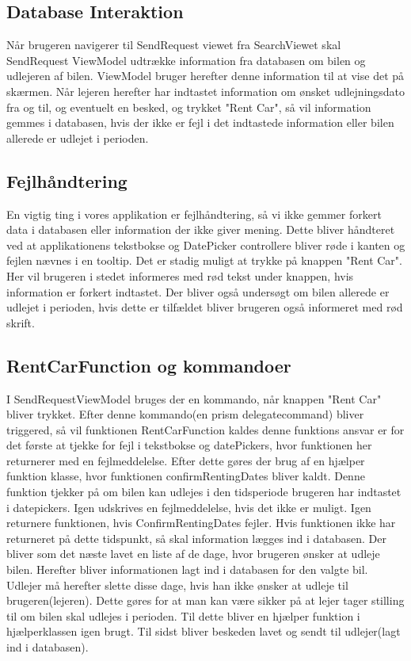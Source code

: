 \documentclass[SoftwareDesign/SoftwareDesign_main.tex]{subfiles}
\begin{document}
\subsection{Database Interaktion}
Når brugeren navigerer til SendRequest viewet fra SearchViewet skal SendRequest ViewModel udtrække information fra databasen om bilen og udlejeren af bilen. ViewModel bruger herefter denne information til at vise det på skærmen. Når lejeren herefter har indtastet information om ønsket udlejningsdato fra og til, og eventuelt en besked, og trykket "Rent Car", så vil information gemmes i databasen, hvis der ikke er fejl i det indtastede information eller bilen allerede er udlejet i perioden. 
\subsection{Fejlhåndtering}
En vigtig ting i vores applikation er fejlhåndtering, så vi ikke gemmer forkert data i databasen eller information der ikke giver mening. Dette bliver håndteret ved at applikationens tekstbokse og DatePicker controllere bliver røde i kanten og fejlen nævnes i en tooltip. Det er stadig muligt at trykke på knappen "Rent Car". Her vil brugeren i stedet informeres med rød tekst under knappen, hvis information er forkert indtastet. Der bliver også undersøgt om bilen allerede er udlejet i perioden, hvis dette er tilfældet bliver brugeren også informeret med rød skrift.
\subsection{RentCarFunction og kommandoer}
I SendRequestViewModel bruges der en kommando, når knappen "Rent Car" bliver trykket. Efter denne kommando(en prism delegatecommand) bliver triggered, så vil funktionen RentCarFunction kaldes denne funktions ansvar er for det første at tjekke for fejl i tekstbokse og datePickers, hvor funktionen her returnerer med en fejlmeddelelse. Efter dette gøres der brug af en hjælper funktion klasse, hvor funktionen confirmRentingDates bliver kaldt. Denne funktion tjekker på om bilen kan udlejes i den tidsperiode brugeren har indtastet i datepickers. Igen udskrives en fejlmeddelelse, hvis det ikke er muligt. Igen returnere funktionen, hvis ConfirmRentingDates fejler. Hvis funktionen ikke har returneret på dette tidspunkt, så skal information lægges ind i databasen. Der bliver som det næste lavet en liste af de dage, hvor brugeren ønsker at udleje bilen. Herefter bliver informationen lagt ind i databasen for den valgte bil. Udlejer må herefter slette disse dage, hvis han ikke ønsker at udleje til brugeren(lejeren). Dette gøres for at man kan være sikker på at lejer tager stilling til om bilen skal udlejes i perioden. Til dette bliver en hjælper funktion i hjælperklassen igen brugt. Til sidst bliver beskeden lavet og sendt til udlejer(lagt ind i databasen).
\end{document}
